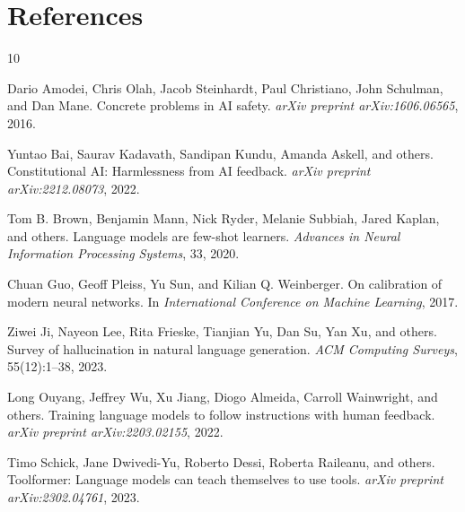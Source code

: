 \documentclass[11pt]{article}
\begin{document}
\section{References}

\begin{thebibliography}{10}

Dario Amodei, Chris Olah, Jacob Steinhardt, Paul Christiano, John Schulman, and Dan Mane.
\newblock Concrete problems in AI safety.
\newblock \emph{arXiv preprint arXiv:1606.06565}, 2016.

Yuntao Bai, Saurav Kadavath, Sandipan Kundu, Amanda Askell, and others.
\newblock Constitutional AI: Harmlessness from AI feedback.
\newblock \emph{arXiv preprint arXiv:2212.08073}, 2022.

Tom B. Brown, Benjamin Mann, Nick Ryder, Melanie Subbiah, Jared Kaplan, and others.
\newblock Language models are few-shot learners.
\newblock \emph{Advances in Neural Information Processing Systems}, 33, 2020.

Chuan Guo, Geoff Pleiss, Yu Sun, and Kilian Q. Weinberger.
\newblock On calibration of modern neural networks.
\newblock In \emph{International Conference on Machine Learning}, 2017.

Ziwei Ji, Nayeon Lee, Rita Frieske, Tianjian Yu, Dan Su, Yan Xu, and others.
\newblock Survey of hallucination in natural language generation.
\newblock \emph{ACM Computing Surveys}, 55(12):1--38, 2023.

Long Ouyang, Jeffrey Wu, Xu Jiang, Diogo Almeida, Carroll Wainwright, and others.
\newblock Training language models to follow instructions with human feedback.
\newblock \emph{arXiv preprint arXiv:2203.02155}, 2022.

Timo Schick, Jane Dwivedi-Yu, Roberto Dessi, Roberta Raileanu, and others.
\newblock Toolformer: Language models can teach themselves to use tools.
\newblock \emph{arXiv preprint arXiv:2302.04761}, 2023.

\end{thebibliography}
\end{document}
